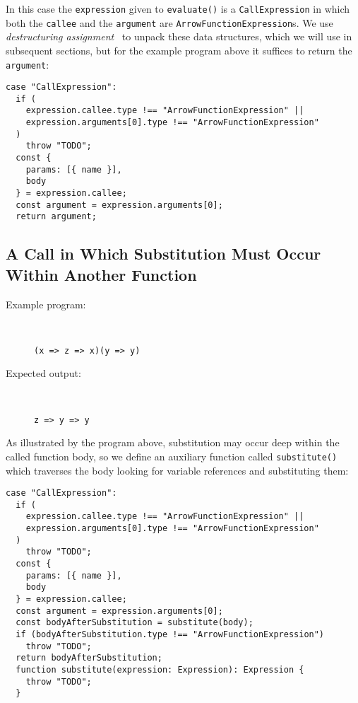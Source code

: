 \documentclass[12pt, oneside]{book}
\begin{document}
In this case the \texttt{expression} given to \texttt{evaluate()} is a \texttt{CallExpression} in which both the \texttt{callee} and the \texttt{argument} are \texttt{ArrowFunctionExpression}s. We use \emph{destructuring assignment}~\cite{destructuring-assignment} to unpack these data structures, which we will use in subsequent sections, but for the example program above it suffices to return the \texttt{argument}:

\begin{verbatim}
case "CallExpression":
  if (
    expression.callee.type !== "ArrowFunctionExpression" ||
    expression.arguments[0].type !== "ArrowFunctionExpression"
  )
    throw "TODO";
  const {
    params: [{ name }],
    body
  } = expression.callee;
  const argument = expression.arguments[0];
  return argument;
\end{verbatim}

\subsection{A Call in Which Substitution Must Occur Within Another Function}

\begin{description}
\item [Example program:] ~

\begin{verbatim}
(x => z => x)(y => y)
\end{verbatim}

\item [Expected output:] ~

\begin{verbatim}
z => y => y
\end{verbatim}
\end{description}

As illustrated by the program above, substitution may occur deep within the called function body, so we define an auxiliary function called \texttt{substitute()} which traverses the body looking for variable references and substituting them:

\begin{verbatim}
case "CallExpression":
  if (
    expression.callee.type !== "ArrowFunctionExpression" ||
    expression.arguments[0].type !== "ArrowFunctionExpression"
  )
    throw "TODO";
  const {
    params: [{ name }],
    body
  } = expression.callee;
  const argument = expression.arguments[0];
  const bodyAfterSubstitution = substitute(body);
  if (bodyAfterSubstitution.type !== "ArrowFunctionExpression")
    throw "TODO";
  return bodyAfterSubstitution;
  function substitute(expression: Expression): Expression {
    throw "TODO";
  }
\end{verbatim}
\end{document}
